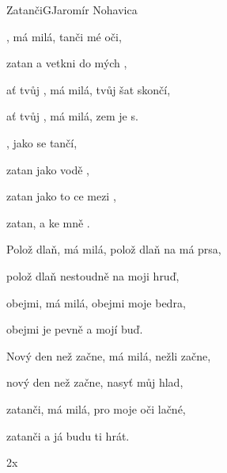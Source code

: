 \setcounter{page}{102}
\begin{song}{Zatanči}{G}{Jaromír Nohavica}

\begin{SBVerse}

, má milá, tanči  mé oči,

zatan a vetkni  do mých ,

ať tvůj , má milá,  tvůj šat  skončí,

ať tvůj , má milá, zem je s.

\end{SBVerse}

\begin{SBChorus}

, jako se   tančí,

zatan jako  vodě ,

zatan jako to ce mezi ,

zatan, a  ke mně .

\end{SBChorus}

\begin{SBVerse}

Polož dlaň, má milá, polož dlaň na má prsa,

polož dlaň nestoudně na moji hruď,

obejmi, má milá, obejmi moje bedra,

obejmi je pevně a mojí buď.

\end{SBVerse}

\begin{SBChorus}

\end{SBChorus}

\begin{SBVerse}

Nový den než začne, má milá, nežli začne,

nový den než začne, nasyť můj hlad,

zatanči, má milá, pro moje oči lačné,

zatanči a já budu ti hrát.

\end{SBVerse}

\begin{SBChorus}
2x
\end{SBChorus}

\end{song}

\clearpage
